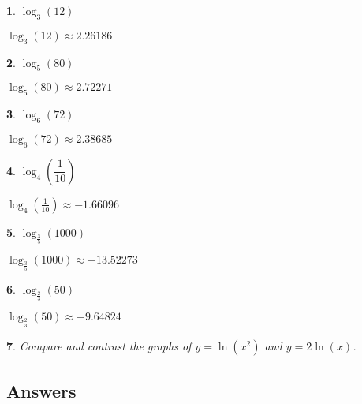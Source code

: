 \documentclass{amsbook}
\newtheorem{exc}{}
\newenvironment{ex}{\begin{exc}\normalfont}{\end{exc}}
\numberwithin{section}{chapter}
\numberwithin{equation}{chapter}
\begin{document}
\begin{multicols}{2}

\begin{ex}
	$\log_{3}(12)$ 
	\begin{sol}
		 $\log_{3}(12) \approx 2.26186$
	\end{sol}
\end{ex}


\begin{ex}
	 $\log_{5}(80)$
	\begin{sol}
		$\log_{5}(80) \approx 2.72271$
	\end{sol}
\end{ex}

\begin{ex}
	$\log_{6}(72)$
	\begin{sol}
		$\log_{6}(72) \approx 2.38685$
	\end{sol}
\end{ex}

\begin{ex}
	 $\log_{4}\left(\dfrac{1}{10}\right)$
	\begin{sol}
	$\log_{4}\left(\frac{1}{10}\right) \approx -1.66096$	
	\end{sol}
\end{ex}


\begin{ex}
	$\log_{\frac{3}{5}}(1000)$
	\begin{sol}
		 $\log_{\frac{3}{5}}(1000) \approx -13.52273$
	\end{sol}
\end{ex}


\begin{ex}
	 $\log_{\frac{2}{3}}(50)$
	\begin{sol}
		$\log_{\frac{2}{3}}(50) \approx -9.64824$
	\end{sol}
\end{ex}
\end{multicols}

\begin{ex}
	Compare and contrast the graphs of $y = \ln(x^{2})$ and $y = 2\ln(x)$.
\end{ex}

\subsection*{Answers \nopunct} \hfill
\begin{multicols}{2}
	
\end{multicols}
\end{document}
